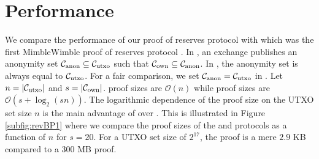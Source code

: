   \section{Performance}
  We compare the performance of our proof of reserves protocol with \R which was the first MimbleWimble proof of reserves protocol \cite{Dutta2019b}.
  In \Rw, an exchange publishes an anonymity set $\mathcal{C}_{\text{anon}} \subseteq \mathcal{C}_{\text{utxo}}$ such that $\mathcal{C}_{\text{own}} \subseteq \mathcal{C}_{\text{anon}}$. 
  In \Rplus, the anonymity set is always equal to $\mathcal{C}_{\text{utxo}}$. For a fair comparison, we set $\mathcal{C}_{\text{anon}} = \mathcal{C}_{\text{utxo}}$ in \Rw. Let $n = \left| \mathcal{C}_{\text{utxo}} \right|$ and $s = \left|\mathcal{C}_{\text{own}}\right|$. \R proof sizes are $\mathcal{O}(n)$ while \RPlus proof sizes are $\mathcal{O}(s+\log_2(sn))$. The logarithmic dependence of the \RPlus proof size on the UTXO set size $n$ is the main advantage of \RPlus over \Rw.
  This is illustrated in Figure \ref{subfig:revBP1} where we compare the proof sizes of the \R and \RPlus protocols as a function of $n$ for $s=20$. 
  For a UTXO set size of $2^{17}$, the \RPlus proof is a mere $2.9$ KB compared to a 300 MB \R proof.
  
  
